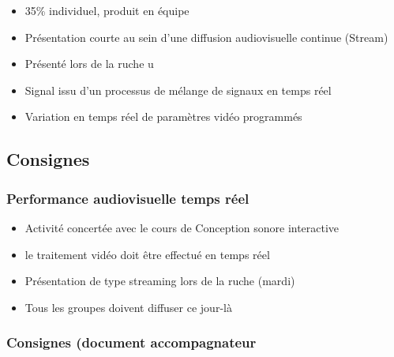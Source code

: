 \documentclass[
  french,
]{book}
\providecommand{\tightlist}{%
  \setlength{\itemsep}{0pt}\setlength{\parskip}{0pt}}
\begin{document}
\begin{itemize}
\tightlist
\item
  35\% individuel, produit en équipe
\item
  Présentation courte au sein d'une diffusion audiovisuelle continue (Stream)
\item
  Présenté lors de la ruche u
\item
  Signal issu d'un processus de mélange de signaux en temps réel
\item
  Variation en temps réel de paramètres vidéo programmés
\end{itemize}

\hypertarget{consignes-4}{%
\subsection{Consignes}\label{consignes-4}}

\hypertarget{performance-audiovisuelle-temps-ruxe9el}{%
\subsubsection{Performance audiovisuelle temps réel}\label{performance-audiovisuelle-temps-ruxe9el}}

\begin{itemize}
\tightlist
\item
  Activité concertée avec le cours de Conception sonore interactive
\item
  le traitement vidéo doit être effectué en temps réel
\item
  Présentation de type streaming lors de la ruche (mardi)
\item
  Tous les groupes doivent diffuser ce jour-là
\end{itemize}

\hypertarget{consignes-document-accompagnateur}{%
\subsubsection{Consignes (document accompagnateur}\label{consignes-document-accompagnateur}}
\end{document}
